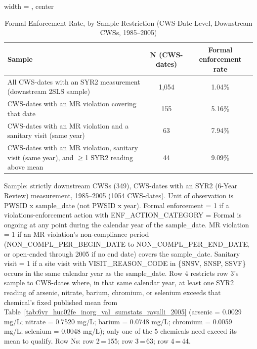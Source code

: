 \begin{table}[htbp]
\caption{\label{tab:sanitary_visit_formal_enforcement_rate_syr2_measurement} Formal Enforcement Rate, by Sample Restriction (CWS-Date Level, Downstream CWSs, 1985--2005)}
\bigskip
\centering
\begin{adjustbox}{width = \textwidth, center}
\begin{tabular}{lcc}
\toprule
Sample & N (CWS-dates) & Formal enforcement rate \\
\midrule
All CWS-dates with an SYR2 measurement (downstream 2SLS sample) & 1{,}054 & 1.04\% \\
CWS-dates with an MR violation covering that date & 155 & 5.16\% \\
CWS-dates with an MR violation and a sanitary visit (same year) & 63 & 7.94\% \\
CWS-dates with an MR violation, sanitary visit (same year), and $\geq$1 SYR2 reading above mean & 44 & 9.09\% \\
\bottomrule
\end{tabular}
\end{adjustbox}
{\tiny\linespread{1}\selectfont \par \raggedright 
Sample: strictly downstream CWSs (349), CWS-dates with an SYR2 (6-Year Review) measurement, 1985--2005 (1054 CWS-dates). Unit of observation is PWSID x sample\_date (not PWSID x year). Formal enforcement = 1 if a violations-enforcement action with ENF\_ACTION\_CATEGORY = Formal is ongoing at any point during the calendar year of the sample\_date. MR violation = 1 if an MR violation's non-compliance period (NON\_COMPL\_PER\_BEGIN\_DATE to NON\_COMPL\_PER\_END\_DATE, or open-ended through 2005 if no end date) covers the sample\_date. Sanitary visit = 1 if a site visit with VISIT\_REASON\_CODE in \{SNSV, SNSP, SSVF\} occurs in the same calendar year as the sample\_date. Row 4 restricts row 3's sample to CWS-dates where, in that same calendar year, at least one SYR2 reading of arsenic, nitrate, barium, chromium, or selenium exceeds that chemical's fixed published mean from Table~\ref{tab:6yr_huc02fe_inorg_val_sumstats_ravalli_2005} (arsenic = 0.0029 mg/L; nitrate = 0.7520 mg/L; barium = 0.0748 mg/L; chromium = 0.0059 mg/L; selenium = 0.0048 mg/L); only one of the 5 chemicals need exceed its mean to qualify. Row Ns: row 2\,=\,155; row 3\,=\,63; row 4\,=\,44.
}
\end{table}

